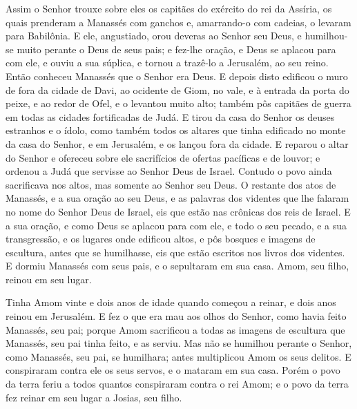 Assim o Senhor trouxe sobre eles os capitães do exército do rei
da Assíria, os quais prenderam a Manassés com ganchos e, amarrando-o
com cadeias, o levaram para Babilônia. E ele, angustiado,
orou deveras ao Senhor seu Deus, e humilhou-se muito perante o Deus
de seus pais; e fez-lhe oração, e Deus se aplacou para com
ele, e ouviu a sua súplica, e tornou a trazê-lo a Jerusalém, ao seu
reino. Então conheceu Manassés que o Senhor era Deus. E
depois disto edificou o muro de fora da cidade de Davi, ao ocidente
de Giom, no vale, e à entrada da porta do peixe, e ao redor de Ofel,
e o levantou muito alto; também pôs capitães de guerra em todas as
cidades fortificadas de Judá.
 E tirou da casa do Senhor os deuses estranhos e o ídolo, como
também todos os altares que tinha edificado no monte da casa do
Senhor, e em Jerusalém, e os lançou fora da cidade. E reparou
o altar do Senhor e ofereceu sobre ele sacrifícios de ofertas
pacíficas e de louvor; e ordenou a Judá que servisse ao Senhor Deus
de Israel. Contudo o povo ainda sacrificava nos altos, mas
somente ao Senhor seu Deus. O restante dos atos de Manassés,
e a sua oração ao seu Deus, e as palavras dos videntes que lhe
falaram no nome do Senhor Deus de Israel, eis que estão nas crônicas
dos reis de Israel. E a sua oração, e como Deus se aplacou
para com ele, e todo o seu pecado, e a sua transgressão, e os
lugares onde edificou altos, e pôs bosques e imagens de escultura,
antes que se humilhasse, eis que estão escritos nos livros dos
videntes. E dormiu Manassés com seus pais, e o sepultaram em
sua casa. Amom, seu filho, reinou em seu lugar.

Tinha Amom vinte e dois anos de idade quando começou a reinar, e
dois anos reinou em Jerusalém. E fez o que era mau aos olhos
do Senhor, como havia feito Manassés, seu pai; porque Amom
sacrificou a todas as imagens de escultura que Manassés, seu pai
tinha feito, e as serviu. Mas não se humilhou perante o
Senhor, como Manassés, seu pai, se humilhara; antes multiplicou Amom
os seus delitos. E conspiraram contra ele os seus servos, e o
mataram em sua casa. Porém o povo da terra feriu a todos
quantos conspiraram contra o rei Amom; e o povo da terra fez reinar
em seu lugar a Josias, seu filho.

\medskip

